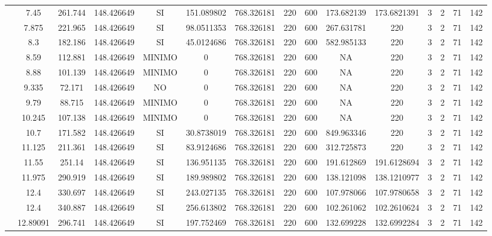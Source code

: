\begin{table}[H]
{\begin{tabular}{|c|c|c|c|c|c|c|c|c|c|c|c|c|c|c|}
\cline{2-15}    & 7.45 & 261.744 & 148.426649 & SI  & 151.089802 & 768.326181 & 220 & 600 & 173.682139 & 173.6821391 & 3   & 2   & 71  & 142 \bigstrut\\
\cline{2-15}    & 7.875 & 221.965 & 148.426649 & SI  & 98.0511353 & 768.326181 & 220 & 600 & 267.631781 & 220 & 3   & 2   & 71  & 142 \bigstrut\\
\cline{2-15}    & 8.3 & 182.186 & 148.426649 & SI  & 45.0124686 & 768.326181 & 220 & 600 & 582.985133 & 220 & 3   & 2   & 71  & 142 \bigstrut\\
\cline{2-15}    & 8.59 & 112.881 & 148.426649 & MINIMO & 0   & 768.326181 & 220 & 600 & NA  & 220 & 3   & 2   & 71  & 142 \bigstrut\\
\cline{2-15}    & 8.88 & 101.139 & 148.426649 & MINIMO & 0   & 768.326181 & 220 & 600 & NA  & 220 & 3   & 2   & 71  & 142 \bigstrut\\
\cline{2-15}    & 9.335 & 72.171 & 148.426649 & NO  & 0   & 768.326181 & 220 & 600 & NA  & 220 & 3   & 2   & 71  & 142 \bigstrut\\
\cline{2-15}    & 9.79 & 88.715 & 148.426649 & MINIMO & 0   & 768.326181 & 220 & 600 & NA  & 220 & 3   & 2   & 71  & 142 \bigstrut\\
\cline{2-15}    & 10.245 & 107.138 & 148.426649 & MINIMO & 0   & 768.326181 & 220 & 600 & NA  & 220 & 3   & 2   & 71  & 142 \bigstrut\\
\cline{2-15}    & 10.7 & 171.582 & 148.426649 & SI  & 30.8738019 & 768.326181 & 220 & 600 & 849.963346 & 220 & 3   & 2   & 71  & 142 \bigstrut\\
\cline{2-15}    & 11.125 & 211.361 & 148.426649 & SI  & 83.9124686 & 768.326181 & 220 & 600 & 312.725873 & 220 & 3   & 2   & 71  & 142 \bigstrut\\
\cline{2-15}    & 11.55 & 251.14 & 148.426649 & SI  & 136.951135 & 768.326181 & 220 & 600 & 191.612869 & 191.6128694 & 3   & 2   & 71  & 142 \bigstrut\\
\cline{2-15}    & 11.975 & 290.919 & 148.426649 & SI  & 189.989802 & 768.326181 & 220 & 600 & 138.121098 & 138.1210977 & 3   & 2   & 71  & 142 \bigstrut\\
\cline{2-15}    & 12.4 & 330.697 & 148.426649 & SI  & 243.027135 & 768.326181 & 220 & 600 & 107.978066 & 107.9780658 & 3   & 2   & 71  & 142 \bigstrut\\
\cline{2-15}    & 12.4 & 340.887 & 148.426649 & SI  & 256.613802 & 768.326181 & 220 & 600 & 102.261062 & 102.2610624 & 3   & 2   & 71  & 142 \bigstrut\\
\cline{2-15}    & 12.89091 & 296.741 & 148.426649 & SI  & 197.752469 & 768.326181 & 220 & 600 & 132.699228 & 132.6992284 & 3   & 2   & 71  & 142 \bigstrut\\

\end{tabular}}
\end{table}
